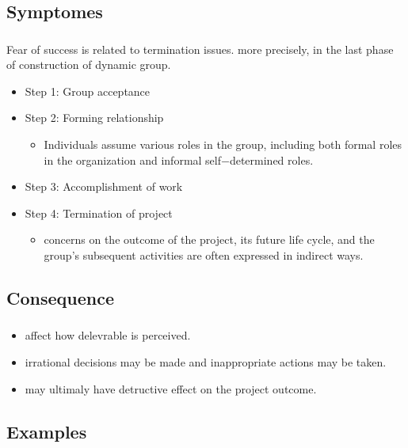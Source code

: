 \documentclass{beamer}
\begin{document}
\subsection{Symptomes}
\begin{frame}
\frametitle{}
 Fear of success is related to termination issues. more precisely, in the last phase of construction of dynamic group.
\begin{itemize}
\item Step 1: Group acceptance
\item Step 2: Forming relationship
\begin{itemize}
\item Individuals assume various roles in the group, including both formal roles in the organization and informal self−determined roles.
\end{itemize}
\item Step 3: Accomplishment of work
\item Step 4: Termination of project
\begin{itemize}
\item concerns on the outcome of the project, its future life cycle, and the group's subsequent activities are often expressed in indirect ways.
\end{itemize}
\end{itemize}
\end{frame}

\subsection{Consequence}
\begin{frame}
\frametitle{}
\begin{itemize}
\item affect how delevrable is perceived.
\item irrational decisions may be made and inappropriate actions may be taken.
\item may ultimaly have detructive effect on the project outcome.
\end{itemize}
\end{frame}

\subsection{Examples}
\begin{frame}
\frametitle{}

\end{frame}
\end{document}
